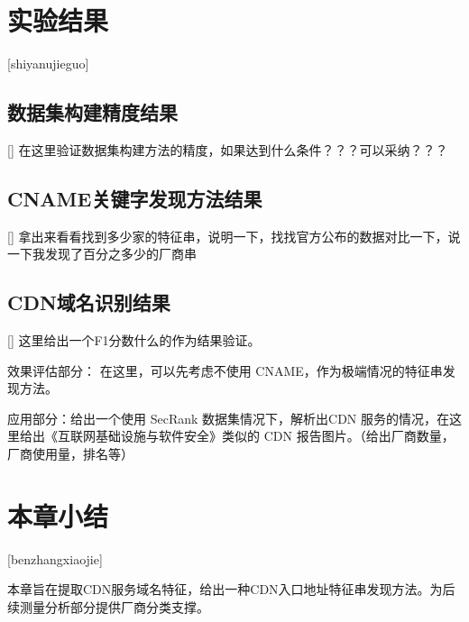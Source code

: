 \section{实验结果}[shiyanujieguo]



\subsection{数据集构建精度结果}[]
在这里验证数据集构建方法的精度，如果达到什么条件？？？可以采纳？？？



\subsection{CNAME关键字发现方法结果}[]
拿出来看看找到多少家的特征串，说明一下，找找官方公布的数据对比一下，说一下我发现了百分之多少的厂商串



\subsection{CDN域名识别结果}[]
这里给出一个F1分数什么的作为结果验证。

效果评估部分： 在这里，可以先考虑不使用 CNAME，作为极端情况的特征串发现方法。

应用部分：给出一个使用 SecRank 数据集\cite{Xie2022}情况下，解析出CDN 服务的情况，在这里给出《互联网基础设施与软件安全》类似的 CDN 报告图片。（给出厂商数量，厂商使用量，排名等）



\section{本章小结}[benzhangxiaojie]




本章旨在提取CDN服务域名特征，给出一种CDN入口地址特征串发现方法。为后续测量分析部分提供厂商分类支撑。




